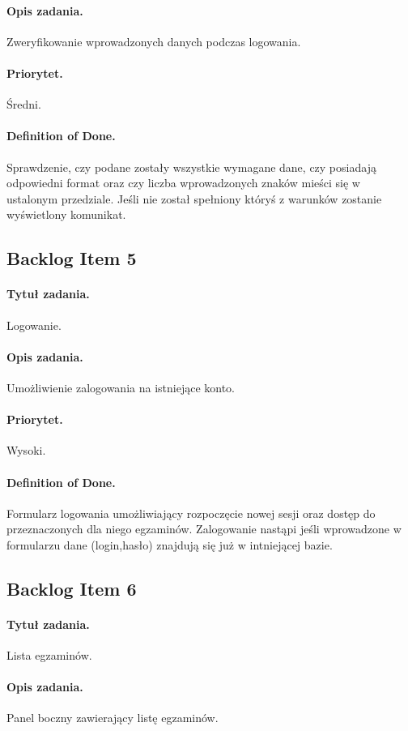 \documentclass[a4paper]{article}
\begin{document}
\paragraph{Opis zadania.} Zweryfikowanie wprowadzonych danych podczas logowania.
\paragraph{Priorytet.} Średni.
\paragraph{Definition of Done.} Sprawdzenie, czy podane zostały wszystkie wymagane dane, czy posiadają odpowiedni format oraz czy liczba wprowadzonych znaków mieści się w ustalonym przedziale. Jeśli nie został spełniony któryś z warunków zostanie wyświetlony komunikat.

\subsection{Backlog Item 5}
\paragraph{Tytuł zadania.} Logowanie.
\paragraph{Opis zadania.} Umożliwienie zalogowania na istniejące konto.
\paragraph{Priorytet.} Wysoki.
\paragraph{Definition of Done.} Formularz logowania umożliwiający rozpoczęcie nowej sesji oraz dostęp do przeznaczonych dla niego egzaminów. Zalogowanie nastąpi jeśli wprowadzone w formularzu dane (login,hasło) znajdują się już w intniejącej bazie.

\subsection{Backlog Item 6}
\paragraph{Tytuł zadania.} Lista egzaminów.
\paragraph{Opis zadania.} Panel boczny zawierający listę egzaminów.
\end{document}
